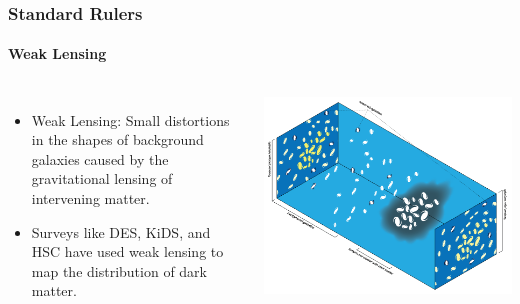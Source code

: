 \documentclass[aspectratio=169]{beamer}
\begin{document}
\begin{frame}
    \frametitle{Standard Rulers}
    \framesubtitle{Weak Lensing}
    \begin{columns}
        \begin{itemize}
            \item Weak Lensing:  Small distortions in the shapes of background galaxies caused by the gravitational lensing of intervening matter.
            \item Surveys like DES, KiDS, and HSC have used weak lensing to map the distribution of dark matter. \hfill {}
        \end{itemize}
        \includegraphics[width=\textwidth]{figures/weak_lensing.png}
    \end{columns}
\end{frame}
\end{document}
